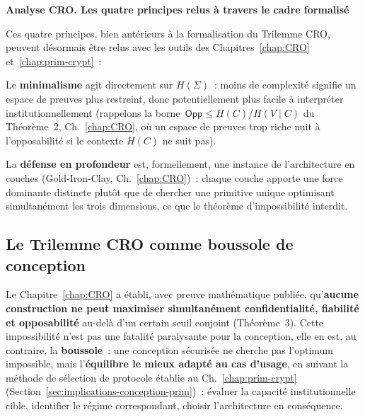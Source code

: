 \begin{boxCRO}
\textbf{Analyse CRO. Les quatre principes relus à travers le
cadre formalisé}

Ces quatre principes, bien antérieurs à la formalisation du Trilemme
CRO, peuvent désormais être relus avec les outils des
Chapitres~\ref{chap:CRO} et~\ref{chap:prim-crypt}~:

Le \textbf{minimalisme} agit directement sur $H(\Sigma)$~: moins de
complexité signifie un espace de preuves plus restreint, donc
potentiellement plus facile à interpréter institutionnellement
(rappelons la borne~$\mathsf{Opp} \leq H(C)/H(V\mid C)$ du
Théorème~2, Ch.~\ref{chap:CRO}, où un espace de preuves trop riche
nuit à l'opposabilité si le contexte $H(C)$ ne suit pas).

La \textbf{défense en profondeur} est, formellement, une instance
de l'architecture en couches (Gold-Iron-Clay, Ch.~\ref{chap:CRO})~:
chaque couche apporte une force dominante distincte plutôt que de
chercher une primitive unique optimisant simultanément les trois
dimensions, ce que le théorème d'impossibilité interdit.

\end{boxCRO}

\subsection{Le Trilemme CRO comme boussole de conception}

Le Chapitre~\ref{chap:CRO} a établi, avec preuve mathématique
publiée, qu'\textbf{aucune construction ne peut maximiser
simultanément confidentialité, fiabilité et opposabilité} au-delà
d'un certain seuil conjoint (Théorème~3). Cette impossibilité n'est pas
une fatalité paralysante pour la conception, elle en est, au
contraire, la \textbf{boussole}~: une conception sécurisée ne
cherche pas l'optimum impossible, mais l'\textbf{équilibre
le mieux adapté au cas d'usage}, en suivant la méthode de sélection
de protocole établie au Ch.~\ref{chap:prim-crypt}
(Section~\ref{sec:implications-conception-prim})~: évaluer la
capacité institutionnelle cible, identifier le régime correspondant,
choisir l'architecture en conséquence.

